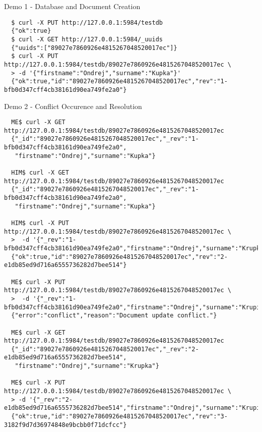\documentclass{beamer}
\begin{document}
\begin{frame}[fragile]{Demo 1 - Database and Document Creation}
  \fontsize{6}{8}\selectfont
  \begin{verbatim}
  $ curl -X PUT http://127.0.0.1:5984/testdb
  {"ok":true}
  $ curl -X GET http://127.0.0.1:5984/_uuids
  {"uuids":["89027e7860926e4815267048520017ec"]}
  $ curl -X PUT http://127.0.0.1:5984/testdb/89027e7860926e4815267048520017ec \
  > -d '{"firstname":"Ondrej","surname":"Kupka"}'
  {"ok":true,"id":"89027e7860926e4815267048520017ec","rev":"1-bfb0d347cff4cb38161d90ea749fe2a0"}
  \end{verbatim}
\end{frame}

\begin{frame}[fragile]{Demo 2 - Conflict Occurence and Resolution}
  \fontsize{6}{8}\selectfont
  \begin{verbatim}
  ME$ curl -X GET http://127.0.0.1:5984/testdb/89027e7860926e4815267048520017ec
  {"_id":"89027e7860926e4815267048520017ec","_rev":"1-bfb0d347cff4cb38161d90ea749fe2a0",
   "firstname":"Ondrej","surname":"Kupka"}

  HIM$ curl -X GET http://127.0.0.1:5984/testdb/89027e7860926e4815267048520017ec
  {"_id":"89027e7860926e4815267048520017ec","_rev":"1-bfb0d347cff4cb38161d90ea749fe2a0",
   "firstname":"Ondrej","surname":"Kupka"}

  HIM$ curl -X PUT http://127.0.0.1:5984/testdb/89027e7860926e4815267048520017ec \
  >  -d '{"_rev":"1-bfb0d347cff4cb38161d90ea749fe2a0","firstname":"Ondrej","surname":"Krupka"}'
  {"ok":true,"id":"89027e7860926e4815267048520017ec","rev":"2-e1db85ed9d716a6555736282d7bee514"}

  ME$ curl -X PUT http://127.0.0.1:5984/testdb/89027e7860926e4815267048520017ec \
  >  -d '{"_rev":"1-bfb0d347cff4cb38161d90ea749fe2a0","firstname":"Ondrej","surname":"Krupicka"}'
  {"error":"conflict","reason":"Document update conflict."}

  ME$ curl -X GET http://127.0.0.1:5984/testdb/89027e7860926e4815267048520017ec
  {"_id":"89027e7860926e4815267048520017ec","_rev":"2-e1db85ed9d716a6555736282d7bee514",
   "firstname":"Ondrej","surname":"Krupka"}

  ME$ curl -X PUT http://127.0.0.1:5984/testdb/89027e7860926e4815267048520017ec \
  > -d '{"_rev":"2-e1db85ed9d716a6555736282d7bee514","firstname":"Ondrej","surname":"Krupicka"}'
  {"ok":true,"id":"89027e7860926e4815267048520017ec","rev":"3-3182f9d7d36974848e9bcbb0f71dcfcc"}
  \end{verbatim}
\end{frame}
\end{document}
